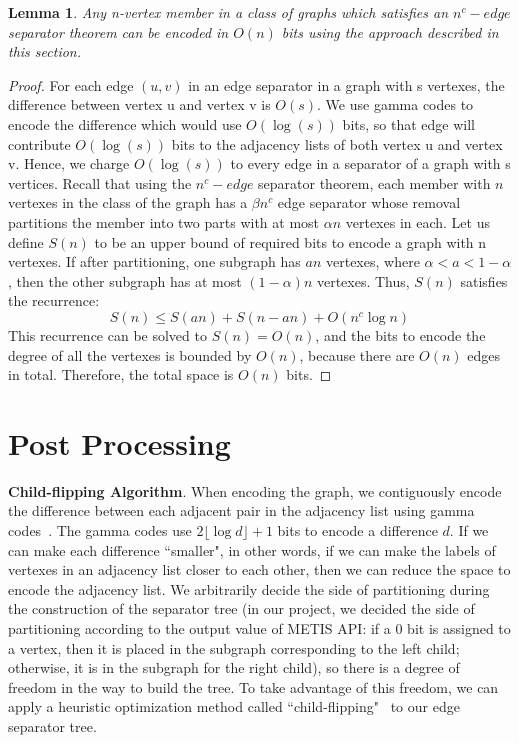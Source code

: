 \documentclass[12pt,glossary]{dalthesis}
\newtheorem{lemma}[theorem]{Lemma}
\begin{document}
\bigskip
\begin{lemma}
Any n-vertex member in a class of graphs which satisfies an $n^{c}-edge$ separator
theorem can be encoded in $O(n)$ bits using the approach described in this section.
\end{lemma}

\bigskip
\begin{proof}
For each edge $(u, v)$ in an edge separator in a graph with s vertexes, the difference
between vertex u and vertex v is $O(s)$. We use gamma codes to encode the difference which would use $O(\log (s))$ bits, so that edge will contribute $O(\log (s))$ bits to the adjacency lists of both vertex u and vertex v. Hence, we charge $O(\log (s))$ to every edge in a separator of a graph with s vertices. Recall that using the $n^{c}- edge$ separator theorem, each member with $n$ vertexes in the class of the graph has a $\beta n^{c}$ edge separator whose removal partitions the member into two parts with at most $\alpha n$ vertexes in each. Let us define $S(n)$ to be an upper bound of required bits to encode a graph with n vertexes. If after partitioning, one subgraph has $an$ vertexes, where $\alpha < a < 1 - \alpha $, then the other subgraph has at most $(1-\alpha)n$ vertexes. Thus, $S(n)$ satisfies the recurrence:
\[ S(n) \leq S(an) + S(n-an) + O(n^{c} \log n) \]
This recurrence can be solved to $S(n) = O(n)$, and the bits to encode the degree of all the vertexes is bounded by $O(n)$, because there are $O(n)$ edges in total. Therefore, the total space is $O(n)$ bits.
\end{proof}

\bigskip
\bigskip

\section{Post Processing}

\textbf{Child-flipping Algorithm}. When encoding the graph, we contiguously encode the difference between each adjacent pair in the adjacency list using gamma codes~\cite{Gamma}. The gamma codes use $2\lfloor \log d \rfloor + 1$ bits to encode a difference $d$. If we can make each difference ``smaller", in other words, if we can make the labels of vertexes in an adjacency list closer to each other, then we can reduce the space to encode the adjacency list. We arbitrarily decide the side of partitioning during the construction of the separator tree (in our project, we decided the side of partitioning according to the output value of METIS API: if a 0 bit is assigned to a vertex, then it is placed in the subgraph corresponding to the left child; otherwise, it is in the subgraph for the right child), so there is a degree of freedom in the way to build the tree. To take advantage of this freedom, we can apply a heuristic optimization method called ``child-flipping"~\cite{compact-representation} to our edge separator tree.
\end{document}
